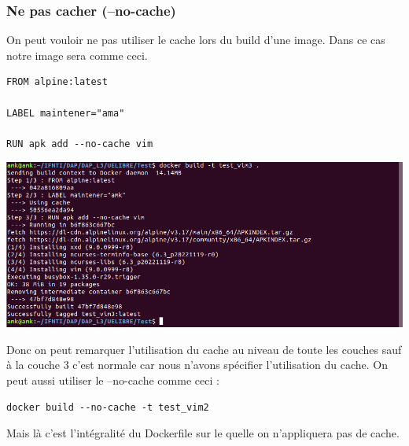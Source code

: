 \documentclass[12pt,a4paper]{article}
\begin{document}
\subsubsection{Ne pas cacher (--no-cache)}
On peut vouloir ne pas utiliser le cache lors du build d'une image. Dans ce cas notre image
sera comme ceci.
\begin{verbatim}
FROM alpine:latest

LABEL maintener="ama"

RUN apk add --no-cache vim
\end{verbatim}
\begin{center}
\includegraphics[scale=0.5]{img/test_vim_no_cache.png}
\end{center}
Donc on peut remarquer l'utilisation du cache au niveau de toute les couches sauf à la 
couche 3 c'est normale car nous n'avons spécifier l'utilisation du cache.
On peut aussi utiliser le --no-cache comme ceci :
\begin{verbatim}
docker build --no-cache -t test_vim2
\end{verbatim}
Mais là c'est l'intégralité du Dockerfile sur le quelle on n'appliquera pas de cache.
\end{document}
